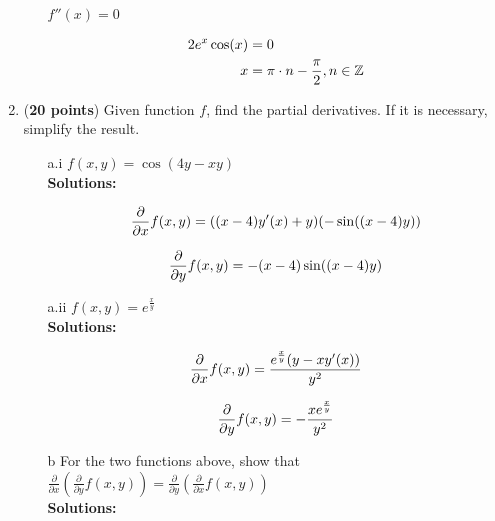 \documentclass[a4paper]{article}
\begin{document}
\begin{enumerate}
\begin{enumerate}
\newpage		
		
$f''(x) = 0$		

\begin{align}
	2e^x\cos(x) &= 0\notag\\
	x &= \pi \cdot n - \frac{\pi}{2}, n \in \mathbb{Z}\notag
\end{align}		
		
\end{enumerate}





\item (\textbf{20 points}) Given function $f$, find the partial derivatives. If it is necessary, simplify the result.

\begin{enumerate}
	\item[a.i] $f(x,y) = \cos(4y - xy)$\\
	\textbf{Solutions:}
	
	
	
	
	
	\begin{align}
		\frac{\partial}{\partial x}f(x,y) = ((x-4)y'(x) + y)(-\sin((x-4)y))\notag
	\end{align}
	
	\begin{align}
		\frac{\partial}{\partial y}f(x,y) = -(x-4)\sin((x-4)y)\notag
	\end{align}
	
	\item[a.ii] $f(x,y) = e^\frac{x}{y}$\\
	\textbf{Solutions:}
	
		\begin{align}
		\frac{\partial}{\partial x}f(x,y) = \frac{e^\frac{x}{y}(y - xy'(x))}{y^2}\notag
	\end{align}
	
	\begin{align}
		\frac{\partial}{\partial y}f(x,y) = - \frac{xe^\frac{x}{y}}{y^2}\notag
	\end{align}
		
		
	\item[b] For the two functions above, show that $\frac{\partial}{\partial x}(\frac{\partial}{\partial y}f(x,y)) = \frac{\partial}{\partial y}(\frac{\partial}{\partial x}f(x,y))$\\
	\textbf{Solutions:}		
		

\end{enumerate}
\end{enumerate}
\end{document}

